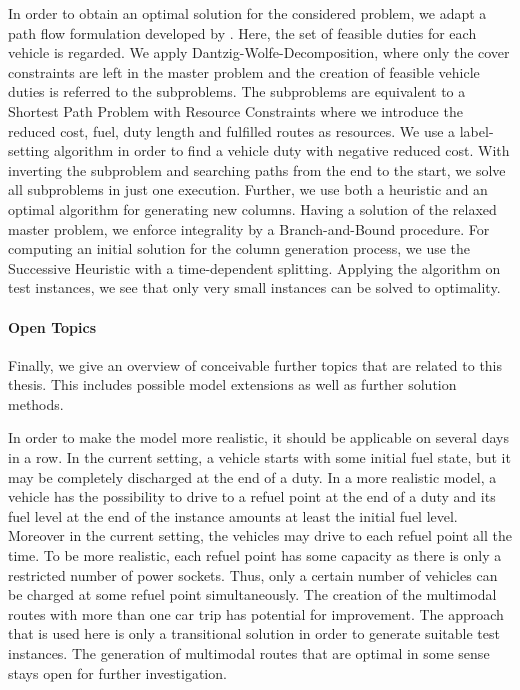 In order to obtain an optimal solution for the considered problem, we adapt a path flow formulation developed by \cite{Kaiser}. Here, the set of feasible duties for each vehicle is regarded. We apply Dantzig-Wolfe-Decomposition, where only the cover constraints are left in the master problem and the creation of feasible vehicle duties is referred to the subproblems. The subproblems are equivalent to a Shortest Path Problem with Resource Constraints where we introduce the reduced cost, fuel, duty length and fulfilled routes as resources. We use a label-setting algorithm in order to find a vehicle duty with negative reduced cost. With inverting the subproblem and searching paths from the end to the start, we solve all subproblems in just one execution. Further, we use both a heuristic and an optimal algorithm for generating new columns. Having a solution of the relaxed master problem, we enforce integrality by a Branch-and-Bound procedure. For computing an initial solution for the column generation process, we use the Successive Heuristic with a time-dependent splitting. Applying the algorithm on test instances, we see that only very small instances can be solved to optimality.

\paragraph{Open Topics} \parfill

Finally, we give an overview of conceivable further topics that are related to this thesis. This includes possible model extensions as well as further solution methods. 

In order to make the model more realistic, it should be applicable on several days in a row. In the current setting, a vehicle starts with some initial fuel state, but it may be completely discharged at the end of a duty. In a more realistic model, a vehicle has the possibility to drive to a refuel point at the end of a duty and its fuel level at the end of the instance amounts at least the initial fuel level. Moreover in the current setting, the vehicles may drive to each refuel point all the time. To be more realistic, each refuel point has some capacity as there is only a restricted number of power sockets. Thus, only a certain number of vehicles can be charged at some refuel point simultaneously. The creation of the multimodal routes with more than one car trip has potential for improvement. The approach that is used here is only a transitional solution in order to generate suitable test instances. The generation of multimodal routes that are optimal in some sense stays open for further investigation.

